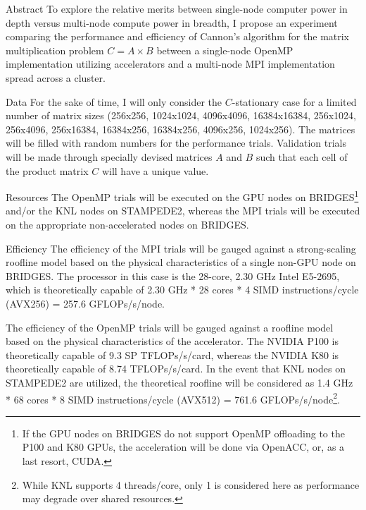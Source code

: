 \documentclass{article}
\begin{document}
\begin{section}{Abstract}
  To explore the relative merits between single-node computer power in depth versus multi-node compute power in breadth,
  I propose an experiment comparing the performance and efficiency of Cannon's algorithm\autocites{Lecture17Slides,GuptaSadayappan} for the matrix multiplication
  problem $C = A \times B$ between a single-node OpenMP implementation utilizing accelerators and a multi-node MPI
  implementation spread across a cluster.
  \begin{subsection}{Data}
    For the sake of time, I will only consider the $C$-stationary case for a limited number of matrix sizes
    (256x256, 1024x1024, 4096x4096, 16384x16384, 256x1024, 256x4096, 256x16384, 16384x256, 16384x256, 4096x256, 1024x256).
    The matrices will be filled with random numbers for the performance trials. Validation trials will be made
    through specially devised matrices $A$ and $B$ such that each cell of the product matrix $C$ will have a unique value.
  \end{subsection}
  \begin{subsection}{Resources}
    The OpenMP trials will be executed on the GPU nodes on BRIDGES\footnote{If the GPU nodes on BRIDGES do not support
    OpenMP offloading to the P100 and K80 GPUs, the acceleration will be done via OpenACC, or, as a last resort, CUDA.}
    and/or the KNL nodes on STAMPEDE2, whereas the MPI trials will be executed on the appropriate non-accelerated nodes
    on BRIDGES.
  \end{subsection}
  \begin{subsection}{Efficiency}
    The efficiency of the MPI trials will be gauged against a strong-scaling roofline model based on the physical
    characteristics of a single non-GPU node on BRIDGES. The processor in this case is the 28-core, 2.30 GHz Intel E5-2695,
    which is theoretically capable of 2.30 GHz * 28 cores * 4 SIMD instructions/cycle (AVX256) = 257.6 GFLOPs/s/node.
    \begin{paragraph}{}
      The efficiency of the OpenMP trials will be gauged against a roofline model based on the physical characteristics of the accelerator.
      The NVIDIA P100 is theoretically capable of 9.3 SP TFLOPs/s/card\autocite{P100Datasheet}, whereas the NVIDIA K80 is theoretically capable of
      8.74 TFLOPs/s/card\autocite{AnandtechK80}. In the event that KNL nodes on STAMPEDE2 are utilized, the theoretical roofline will
      be considered as 1.4 GHz * 68 cores * 8 SIMD instructions/cycle (AVX512) = 761.6 GFLOPs/s/node\autocite{Stampede2UserGuide}\footnote{While KNL supports 4 threads/core, only 1 is considered here as performance may degrade over shared resources.}.

\end{paragraph}
\end{subsection}
\end{section}
\end{document}
